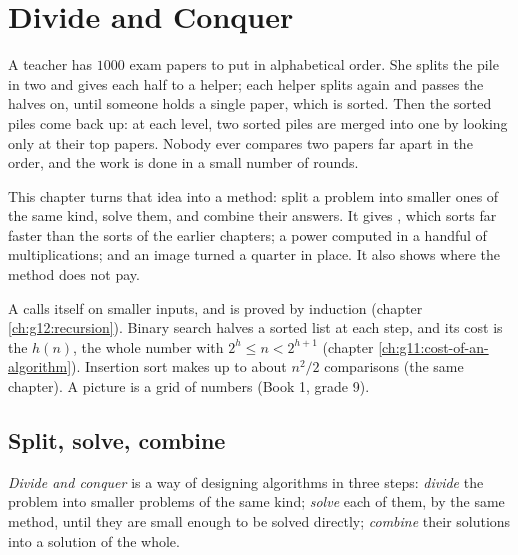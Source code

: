 \chapter{Divide and Conquer}\label{ch:g12:divide-and-conquer}

A teacher has $1000$ exam papers to put in alphabetical order. She splits the pile in two and gives each half to a
helper; each helper splits again and passes the halves on, until someone holds a single paper, which is sorted. Then
the sorted piles come back up: at each level, two sorted piles are merged into one by looking only at their top
papers. Nobody ever compares two papers far apart in the order, and the work is done in a small number of rounds.

This chapter turns that idea into a method: split a problem into smaller ones of the same kind, solve them, and
combine their answers. It gives , which sorts far faster than the sorts of the earlier chapters; a power
computed in a handful of multiplications; and an image turned a quarter in place. It also shows where the method
does not pay.

\begin{recall}
A  calls itself on smaller inputs, and is proved by induction (chapter \ref{ch:g12:recursion}).
Binary search halves a sorted list at each step, and its cost is the  $h(n)$, the whole number with
$2^h \le n < 2^{h+1}$ (chapter \ref{ch:g11:cost-of-an-algorithm}). Insertion sort makes up to about $n^2/2$
comparisons (the same chapter). A picture is a grid of numbers (Book 1, grade 9).
\end{recall}

\section{Split, solve, combine}\label{sec:g12:divide-and-conquer:method}

\begin{definition}\label{def:g12:divide-and-conquer:dc}
\emph{Divide and conquer} is a way of designing algorithms in three steps: \emph{divide}
the problem into smaller problems of the same kind; \emph{solve} each of them, by the same method, until they are
small enough to be solved directly; \emph{combine} their solutions into a solution of the whole.
\end{definition}

